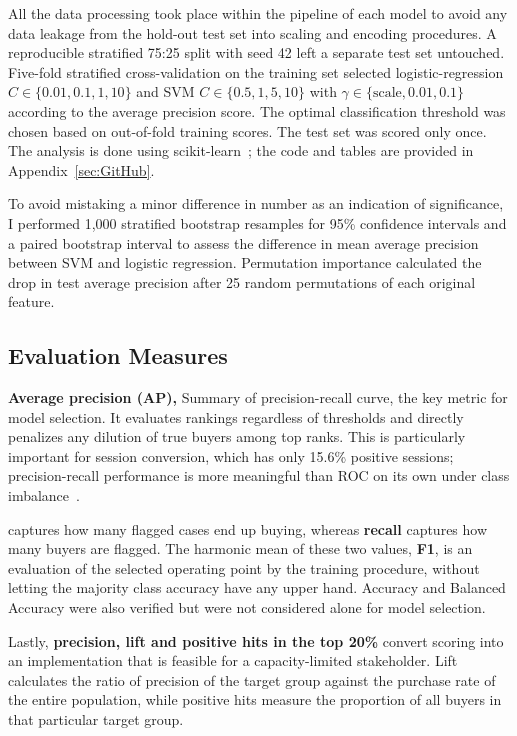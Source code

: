 All the data processing took place within the pipeline of each model to avoid any data leakage from the hold-out test set into scaling and encoding procedures. A reproducible stratified 75:25 split with seed 42 left a separate test set untouched. Five-fold stratified cross-validation on the training set selected logistic-regression $C\in\{0.01,0.1,1,10\}$ and SVM $C\in\{0.5,1,5,10\}$ with $\gamma\in\{\text{scale},0.01,0.1\}$ according to the average precision score. The optimal classification threshold was chosen based on out-of-fold training scores. The test set was scored only once. The analysis is done using scikit-learn~\cite{pedregosa2011scikit}; the code and tables are provided in Appendix~\ref{sec:GitHub}.

To avoid mistaking a minor difference in number as an indication of significance, I performed 1,000 stratified bootstrap resamples for 95\% confidence intervals and a paired bootstrap interval to assess the difference in mean average precision between SVM and logistic regression. Permutation
importance calculated the drop in test average precision after 25 random permutations of each original feature.

\subsection{Evaluation Measures}

\textbf{Average precision (AP),} Summary of precision-recall curve, the key metric for model selection. It evaluates rankings regardless of thresholds and directly penalizes any dilution of true buyers among top ranks. This is particularly important for session conversion, which has only 15.6\% positive sessions; precision-recall performance is more meaningful than ROC on its own under class imbalance~\cite{saito2015precision}.

captures how many flagged cases end up buying, whereas \textbf{recall} captures how many buyers are flagged. The harmonic mean of these two values, \textbf{F1}, is an evaluation of the selected operating point by the training procedure, without letting the majority class accuracy have any upper hand. Accuracy and Balanced Accuracy were also verified but were not considered alone for model selection.

Lastly, \textbf{precision, lift and positive hits in the top 20\%} convert scoring into an implementation that is feasible for a capacity-limited stakeholder. Lift calculates the ratio of precision of the target group against the purchase rate of the entire population, while positive hits measure the proportion of all buyers in that particular target group.

